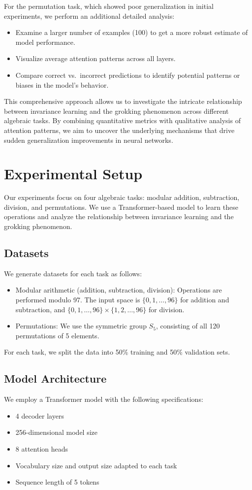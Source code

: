 \documentclass{article} %
\begin{document}
For the permutation task, which showed poor generalization in initial experiments, we perform an additional detailed analysis:

\begin{itemize}
    \item Examine a larger number of examples (100) to get a more robust estimate of model performance.
    \item Visualize average attention patterns across all layers.
    \item Compare correct vs.\ incorrect predictions to identify potential patterns or biases in the model's behavior.
\end{itemize}

This comprehensive approach allows us to investigate the intricate relationship between invariance learning and the grokking phenomenon across different algebraic tasks. By combining quantitative metrics with qualitative analysis of attention patterns, we aim to uncover the underlying mechanisms that drive sudden generalization improvements in neural networks.

\section{Experimental Setup}
\label{sec:experimental}

Our experiments focus on four algebraic tasks: modular addition, subtraction, division, and permutations. We use a Transformer-based model to learn these operations and analyze the relationship between invariance learning and the grokking phenomenon.

\subsection{Datasets}
We generate datasets for each task as follows:
\begin{itemize}
    \item Modular arithmetic (addition, subtraction, division): Operations are performed modulo 97. The input space is $\{0, 1, \ldots, 96\}$ for addition and subtraction, and $\{0, 1, \ldots, 96\} \times \{1, 2, \ldots, 96\}$ for division.
    \item Permutations: We use the symmetric group $S_5$, consisting of all 120 permutations of 5 elements.
\end{itemize}
For each task, we split the data into 50\% training and 50\% validation sets.

\subsection{Model Architecture}
We employ a Transformer model with the following specifications:
\begin{itemize}
    \item 4 decoder layers
    \item 256-dimensional model size
    \item 8 attention heads
    \item Vocabulary size and output size adapted to each task
    \item Sequence length of 5 tokens
\end{itemize}
\end{document}
